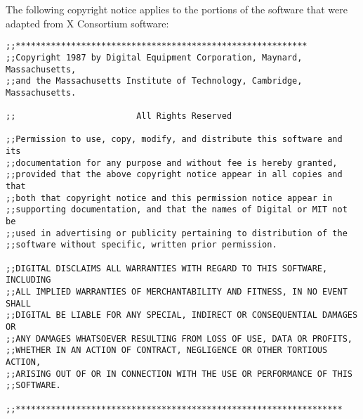 The following copyright notice applies to the portions of the software
that were adapted from X Consortium software:
\begin{verbatim}
;;**********************************************************
;;Copyright 1987 by Digital Equipment Corporation, Maynard, Massachusetts,
;;and the Massachusetts Institute of Technology, Cambridge, Massachusetts.

;;                        All Rights Reserved

;;Permission to use, copy, modify, and distribute this software and its 
;;documentation for any purpose and without fee is hereby granted, 
;;provided that the above copyright notice appear in all copies and that
;;both that copyright notice and this permission notice appear in 
;;supporting documentation, and that the names of Digital or MIT not be
;;used in advertising or publicity pertaining to distribution of the
;;software without specific, written prior permission.  

;;DIGITAL DISCLAIMS ALL WARRANTIES WITH REGARD TO THIS SOFTWARE, INCLUDING
;;ALL IMPLIED WARRANTIES OF MERCHANTABILITY AND FITNESS, IN NO EVENT SHALL
;;DIGITAL BE LIABLE FOR ANY SPECIAL, INDIRECT OR CONSEQUENTIAL DAMAGES OR
;;ANY DAMAGES WHATSOEVER RESULTING FROM LOSS OF USE, DATA OR PROFITS,
;;WHETHER IN AN ACTION OF CONTRACT, NEGLIGENCE OR OTHER TORTIOUS ACTION,
;;ARISING OUT OF OR IN CONNECTION WITH THE USE OR PERFORMANCE OF THIS
;;SOFTWARE.

;;*****************************************************************

\end{verbatim}





